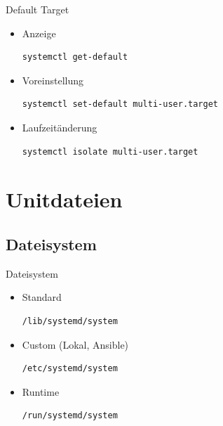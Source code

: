 \begin{frame}[fragile]{Default Target}
  \begin{itemize}
    \item Anzeige
\begin{lstlisting}
systemctl get-default
\end{lstlisting}

    \item Voreinstellung

\begin{lstlisting}
systemctl set-default multi-user.target
\end{lstlisting}

    \item Laufzeitänderung

\begin{lstlisting}
systemctl isolate multi-user.target
\end{lstlisting}

  \end{itemize}
\end{frame}

\section{Unitdateien}

\subsection{Dateisystem}

\begin{frame}[fragile]{Dateisystem}
  \begin{itemize}
\item Standard

\begin{lstlisting}
/lib/systemd/system
\end{lstlisting}

\item Custom (Lokal, Ansible)

\begin{lstlisting}
/etc/systemd/system
\end{lstlisting}

\item Runtime

\begin{lstlisting}
/run/systemd/system
\end{lstlisting}

\end{itemize}
\end{frame}

